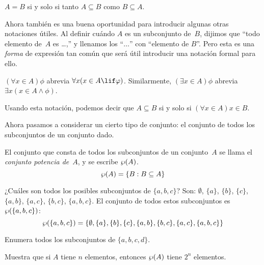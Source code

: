 \documentclass[../../../include/open-logic-section]{subfiles}
\begin{document}
\begin{prop}
$A = B$ si y solo si tanto $A \subseteq B$ como $B \subseteq A$.
\end{prop}

Ahora también es una buena oportunidad para introducir algunas otras notaciones útiles. Al definir cuándo $A$ es un subconjunto de~$B$, dijimos que ``todo elemento de~$A$ es \dots,'' y llenamos los ``$\dots$'' con ``elemento de $B$''. Pero esta es una \emph{forma} de expresión tan común que será útil introducir una notación formal para ello.

\begin{defn}
$(\forall x \in A)\phi$ abrevia $\forall x(x \in A \lif \phi)$. Similarmente, $(\exists x \in A)\phi$ abrevia $\exists x(x \in A \land \phi)$. 
\end{defn}

Usando esta notación, podemos decir que $A \subseteq B$ si y solo si $(\forall x \in A)x \in B$. 

Ahora pasamos a considerar un cierto tipo de conjunto: el conjunto de todos los subconjuntos de un conjunto dado. 

\begin{defn}
El conjunto que consta de todos los subconjuntos de un conjunto~$A$ se llama el \emph{conjunto potencia de}~$A$, y se escribe $\wp(A)$.
  \[
    \Pow{A} = \Setabs{B}{B \subseteq A} 
  \]
\end{defn}

\begin{ex}
¿Cuáles son todos los posibles subconjuntos de $\{ a, b, c \}$? Son: $\emptyset$, $\{a \}$, $\{b\}$, $\{c\}$, $\{a, b\}$, $\{a, c\}$, $\{b, c\}$, $\{a, b, c\}$. El conjunto de todos estos subconjuntos es $\wp(\{a,b,c\})$:
\[
\wp(\{ a, b, c \}) = \{\emptyset, \{a \}, \{b\}, \{c\}, \{a, b\}, \{b, c\}, \{a, c\}, \{a, b, c\}\}
\]
\end{ex}

\begin{prob}
Enumera todos los subconjuntos de $\{a, b, c, d\}$.
\end{prob}

\begin{prob}
Muestra que si $A$ tiene $n$ elementos, entonces $\wp(A)$ tiene $2^n$ elementos.
\end{prob}
\end{document}
